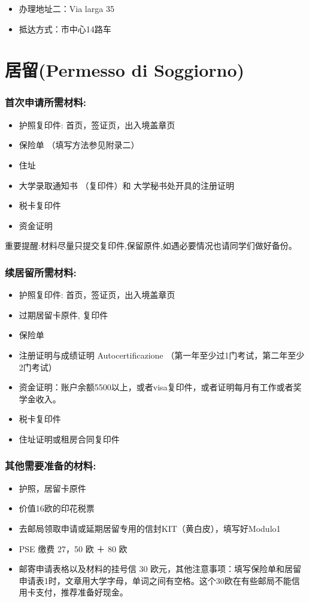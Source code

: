 \begin{itemize}
\item 办理地址二：Via larga 35
\item 抵达方式：市中心14路车
\end{itemize}


\section{居留(Permesso di Soggiorno)}
\subsubsection{首次申请所需材料:}
\begin{itemize} 
\item 护照复印件: 首页，签证页，出入境盖章页
\item 保险单 （填写方法参见附录二）
\item 住址
\item 大学录取通知书 （复印件）和 大学秘书处开具的注册证明
\item 税卡复印件
\item 资金证明
\end{itemize}
重要提醒:材料尽量只提交复印件,保留原件,如遇必要情况也请同学们做好备份。

\subsubsection{续居留所需材料:}
\begin{itemize} 
\item 护照复印件: 首页，签证页，出入境盖章页
\item 过期居留卡原件, 复印件
\item 保险单
\item 注册证明与成绩证明 Autocertificazione （第一年至少过1门考试，第二年至少2门考试）
\item 资金证明：账户余额5500以上，或者visa复印件，或者证明每月有工作或者奖学金收入。
\item 税卡复印件
\item 住址证明或租房合同复印件
\end{itemize}

\subsubsection{其他需要准备的材料:}
\begin{itemize} 
\item 护照，居留卡原件
\item 价值16欧的印花税票
\item 去邮局领取申请或延期居留专用的信封KIT（黄白皮），填写好Modulo1
\item PSE 缴费 27，50 欧 ＋ 80 欧
\item 邮寄申请表格以及材料的挂号信 30 欧元，其他注意事项：填写保险单和居留申请表1时，文章用大学字母，单词之间有空格。这个30欧在有些邮局不能信用卡支付，推荐准备好现金。
\end{itemize}


